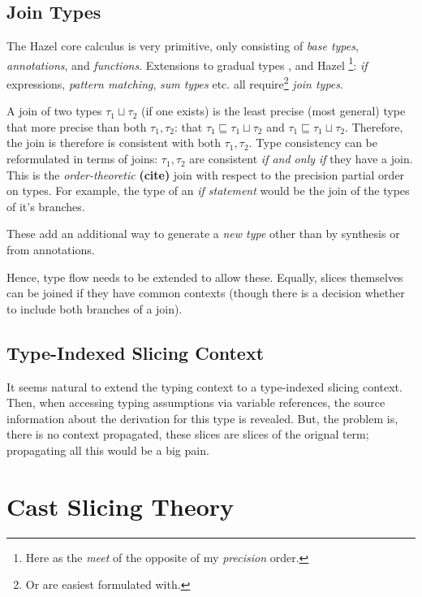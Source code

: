 \subsection{Join Types}\label{sec:JoinTypesTheory}
The Hazel core calculus is very primitive, only consisting of \textit{base types}, \textit{annotations}, and \textit{functions}. Extensions to gradual types \cite{GradualJoins}, and Hazel \cite{MarkedLocalisation}\footnote{Here as the \textit{meet} of the opposite of my \textit{precision} order.}: \textit{if} expressions, \textit{pattern matching}, \textit{sum types} etc. all require\footnote{Or are easiest formulated with.} \textit{join types}. 

A join of two types $\tau_1 \sqcup \tau_2$ (if one exists) is the least precise (most general) type that more precise than both $\tau_1, \tau_2$: that $\tau_1 \sqsubseteq \tau_1 \sqcup \tau_2$ and $\tau_1 \sqsubseteq \tau_1 \sqcup \tau_2$. Therefore, the join is therefore is consistent with both $\tau_1, \tau_2$. Type consistency can be reformulated in terms of joins: $\tau_1, \tau_2$ are consistent \textit{if and only if} they have a join. This is the \textit{order-theoretic} \textbf{(cite)} join with respect to the precision partial order on types. 
For example, the type of an \textit{if statement} would be the join of the types of it's branches.

These add an additional way to generate a \textit{new type} other than by synthesis or from annotations. 

Hence, type flow needs to be extended to allow these. Equally, slices themselves can be joined if they have common contexts (though there is a decision whether to include both branches of a join).

\subsection{Type-Indexed Slicing Context}
\label{sec:TypeSliceContext}
It seems natural to extend the typing context to a type-indexed slicing context. Then, when accessing typing assumptions via variable references, the source information about the derivation for this type is revealed. But, the problem is, there is no context propagated, these slices are slices of the orignal term; propagating all this would be a big pain.

\section{Cast Slicing Theory}\label{sec:CastSlicingTheory}

